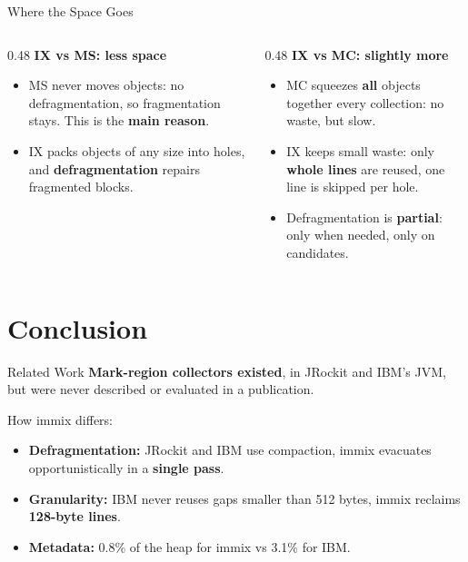 \documentclass[aspectratio=169]{beamer}
\begin{document}
\begin{frame}{Where the Space Goes}
	\begin{columns}[T]
		\begin{column}{0.48\textwidth}
			\textcolor{themeExample}{\textbf{IX vs MS: less space}}

			\small
			\begin{itemize}
				\item MS never moves objects: \alert{no defragmentation}, so fragmentation stays. This is the \textbf{main reason}.
				\item IX packs objects of any size into holes, and \textbf{defragmentation} repairs fragmented blocks.
			\end{itemize}
		\end{column}

		\begin{column}{0.48\textwidth}
			\textcolor{themeAlert}{\textbf{IX vs MC: slightly more}}

			\small
			\begin{itemize}
				\item MC squeezes \textbf{all} objects together every collection: no waste, but slow.
				\item IX keeps small waste: only \textbf{whole lines} are reused, one line is skipped per hole.
				\item Defragmentation is \textbf{partial}: only when needed, only on candidates.
			\end{itemize}
		\end{column}
	\end{columns}
\end{frame}

\section{Conclusion}

\begin{frame}{Related Work}
	\textbf{Mark-region collectors existed}, in JRockit and IBM's JVM, but were never described or evaluated in a publication.

	\medskip
	How immix differs:

	\begin{itemize}
		\item \textbf{Defragmentation:} JRockit and IBM use \alert{compaction}, immix evacuates opportunistically in a \textbf{single pass}.
		\item \textbf{Granularity:} IBM never reuses gaps smaller than 512 bytes, immix reclaims \textbf{128-byte lines}.
		\item \textbf{Metadata:} 0.8\% of the heap for immix vs 3.1\% for IBM.
	\end{itemize}
\end{frame}
\end{document}
